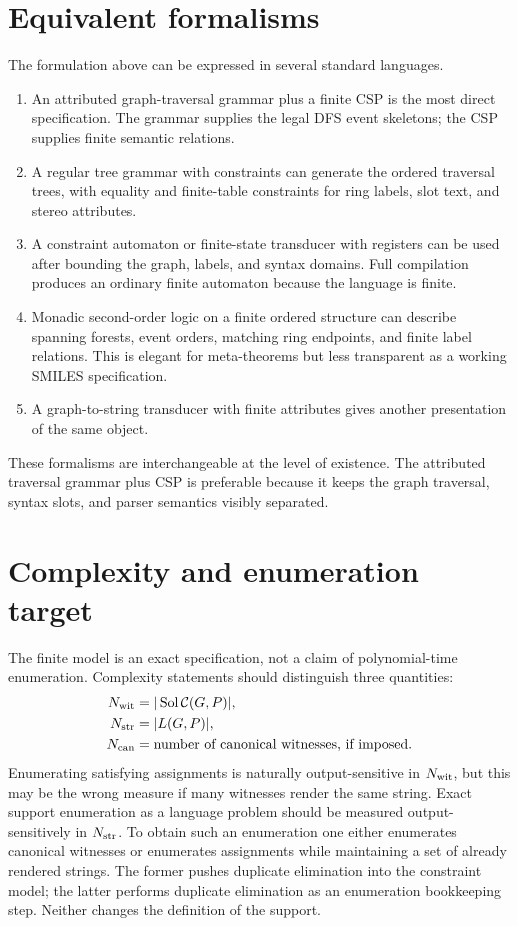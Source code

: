 \documentclass[10pt,a4paper]{article}
\newcommand{\calC}{\mathcal C}
\newcommand{\Sol}{\operatorname{Sol}}
\theoremstyle{definition}
\theoremstyle{remark}
\begin{document}
	\section{Equivalent formalisms}
	\label{s:formalism}

	The formulation above can be expressed in several standard languages.
	\begin{enumerate}[label=\textup{(F\arabic*)},leftmargin=2.5em]
		\item An attributed graph-traversal grammar plus a finite CSP is the most direct
		specification.  The grammar supplies the legal DFS event skeletons; the CSP
		supplies finite semantic relations.
		\item A regular tree grammar with constraints can generate the ordered traversal
		trees, with equality and finite-table constraints for ring labels, slot text,
		and stereo attributes.
		\item A constraint automaton or finite-state transducer with registers can be
		used after bounding the graph, labels, and syntax domains.  Full compilation
		produces an ordinary finite automaton because the language is finite.
		\item Monadic second-order logic on a finite ordered structure can describe
		spanning forests, event orders, matching ring endpoints, and finite label
		relations.  This is elegant for meta-theorems but less transparent as a working
		SMILES specification.
		\item A graph-to-string transducer with finite attributes gives another
		presentation of the same object.
	\end{enumerate}
	These formalisms are interchangeable at the level of existence.  The attributed
	traversal grammar plus CSP is preferable because it keeps the graph traversal,
	syntax slots, and parser semantics visibly separated.

	\section{Complexity and enumeration target}
	\label{s:complexity}

	The finite model is an exact specification, not a claim of polynomial-time
	enumeration.  Complexity statements should distinguish three quantities:
	\[
	\begin{aligned}
		N_{\rm wit}&=|\Sol\calC(G,P)|,\\
		N_{\rm str}&=|L(G,P)|,\\
		N_{\rm can}&=\text{number of canonical witnesses, if imposed}.
	\end{aligned}
	\]
	Enumerating satisfying assignments is naturally output-sensitive in
	\(N_{\rm wit}\), but this may be the wrong measure if many witnesses render the
	same string.  Exact support enumeration as a language problem should be measured
	output-sensitively in \(N_{\rm str}\).  To obtain such an enumeration one either
	enumerates canonical witnesses or enumerates assignments while maintaining a set
	of already rendered strings.  The former pushes duplicate elimination into the
	constraint model; the latter performs duplicate elimination as an enumeration
	bookkeeping step.  Neither changes the definition of the support.
\end{document}
